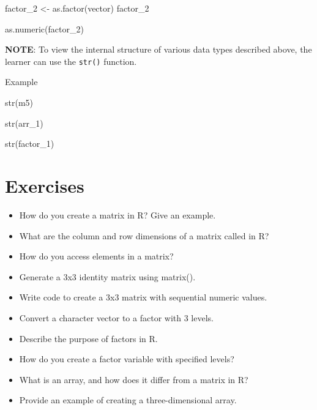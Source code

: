 \documentclass[
  letterpaper,
  DIV=11,
  numbers=noendperiod]{scrreprt}
\newenvironment{Shaded}{}{}
\newcommand{\FunctionTok}[1]{\textcolor[rgb]{0.44,0.26,0.76}{#1}}
\newcommand{\NormalTok}[1]{\textcolor[rgb]{0.14,0.16,0.18}{#1}}
\newcommand{\OtherTok}[1]{\textcolor[rgb]{0.44,0.26,0.76}{#1}}
\begin{document}
\begin{Shaded}
\begin{Highlighting}[]
\NormalTok{factor\_2 }\OtherTok{\textless{}{-}} \FunctionTok{as.factor}\NormalTok{(vector) }
\NormalTok{factor\_2}
\end{Highlighting}
\end{Shaded}

\begin{Shaded}
\begin{Highlighting}[]
\FunctionTok{as.numeric}\NormalTok{(factor\_2)}
\end{Highlighting}
\end{Shaded}

\textbf{NOTE}: To view the internal structure of various data types
described above, the learner can use the \texttt{str()} function.

Example

\begin{Shaded}
\begin{Highlighting}[]
\FunctionTok{str}\NormalTok{(m5)}
\end{Highlighting}
\end{Shaded}

\begin{Shaded}
\begin{Highlighting}[]
\FunctionTok{str}\NormalTok{(arr\_1)}
\end{Highlighting}
\end{Shaded}

\begin{Shaded}
\begin{Highlighting}[]
\FunctionTok{str}\NormalTok{(factor\_1)}
\end{Highlighting}
\end{Shaded}

\section{Exercises}\label{exercises-10}

\begin{itemize}
\item
  How do you create a matrix in R? Give an example.
\item
  What are the column and row dimensions of a matrix called in R?
\item
  How do you access elements in a matrix?
\item
  Generate a 3x3 identity matrix using matrix().
\item
  Write code to create a 3x3 matrix with sequential numeric values.
\item
  Convert a character vector to a factor with 3 levels.
\item
  Describe the purpose of factors in R.
\item
  How do you create a factor variable with specified levels?
\item
  What is an array, and how does it differ from a matrix in R?
\item
  Provide an example of creating a three-dimensional array.
\end{itemize}
\end{document}

